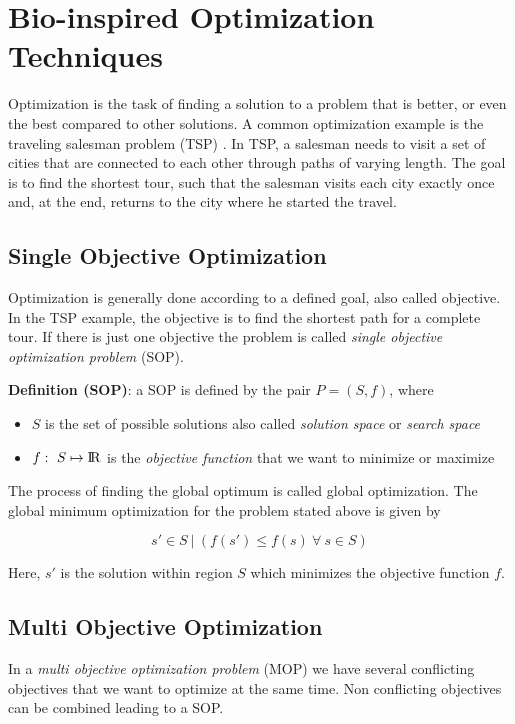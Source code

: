 \chapter{Bio-inspired Optimization Techniques}
\label{chap:bioalgorithms}

Optimization is the task of finding a solution to a problem that is better, or even the best compared to other solutions. A common optimization example is the traveling salesman problem (TSP) \cite{alexander2005history}. In TSP, a salesman needs to visit a set of cities that are connected to each other through paths of varying length. The goal is to find the shortest tour, such that the salesman visits each city exactly once and, at the end, returns to the city where he started the travel.

\section{Single Objective Optimization}
Optimization is generally done according to a defined goal, also called objective. In the TSP example, the objective is to find the shortest path for a complete tour. If there is just one objective the problem is called \emph{single objective optimization problem} (SOP). 

\noindent\textbf{Definition (SOP)}: a SOP is defined by the pair $P=(S,f)$, where
\begin{itemize}
  \item $S$ is the set of possible solutions also called \emph{solution space} or \emph{search space}
  \item $f: \ S \mapsto {\rm I\!R}$ is the \emph{objective function} that we want to minimize or maximize
\end{itemize}
The process of finding the global optimum is called global optimization. The global minimum optimization for the problem stated above is given by

\begin{equation}\label{eq:global-minimum-optimization}
  s' \in S \ | \ (f(s') \leq f(s) \ \forall \ s \in S)
\end{equation}

Here, $s'$ is the solution within region $S$ which minimizes the objective function $f$.

\section{Multi Objective Optimization}
In a \emph{multi objective optimization problem} (MOP) we have several conflicting objectives that we want to optimize at the same time. Non conflicting objectives can be combined leading to a SOP.

